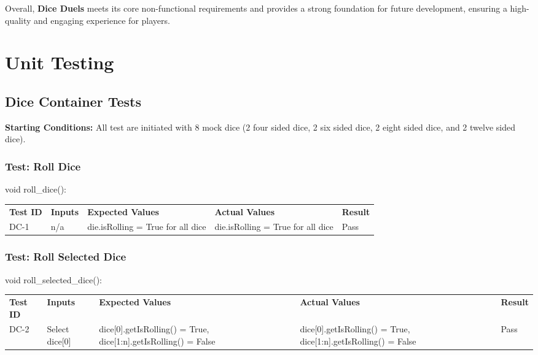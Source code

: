 \documentclass[12pt, titlepage]{article}
\begin{document}
Overall, \textbf{Dice Duels} meets its core non-functional requirements and provides a strong foundation for future development, ensuring a high-quality and engaging experience for players.




\newpage
\section{Unit Testing}

\subsection{Dice Container Tests}

\textbf{Starting Conditions:} All test are initiated with 8 mock dice (2 four sided dice, 2 six sided dice, 2 eight sided dice, and 2 twelve sided dice).

\subsubsection{Test: Roll Dice}
void roll\_dice():\\
\begin{tabularx}{\textwidth}{|p{2cm}|p{2.5cm}|p{3.75cm}|p{3.75cm}|p{1.5cm}|}
    \cline{1-5}
    \textbf{Test ID} & \textbf{Inputs} & \textbf{Expected Values} & \textbf{Actual Values} & \textbf{Result} \\
    \cline{1-5}
    DC-1 & n/a & die.isRolling = True for all dice & die.isRolling = True for all dice & Pass \\
    \cline{1-5}
\end{tabularx}

\subsubsection{Test: Roll Selected Dice}
void roll\_selected\_dice():\\
\begin{tabularx}{\textwidth}{|p{1.75cm}|p{2.5cm}|p{4cm}|p{4cm}|p{1.25cm}|}
    \cline{1-5}
    \textbf{Test ID} & \textbf{Inputs} & \textbf{Expected Values} & \textbf{Actual Values} & \textbf{Result} \\
    \cline{1-5}
    DC-2 & Select dice[0] & dice[0].getIsRolling() = True, dice[1:n].getIsRolling() = False & dice[0].getIsRolling() = True, dice[1:n].getIsRolling() = False & Pass \\
    \cline{1-5}
\end{tabularx}
\end{document}
